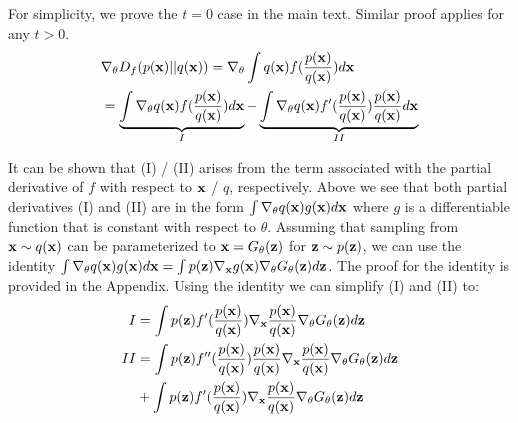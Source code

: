\begin{proofs} For simplicity, we prove the $t=0$ case in the main text. Similar proof applies for any $t>0$.
{\small
\begin{align*}
&\nabla_\theta D_f(p({\mathbf{x}})||q({\mathbf{x}})) =   \nabla_\theta \int q({\mathbf{x}}) f(\frac{p({\mathbf{x}})}{q({\mathbf{x}})}) d{\mathbf{x}} \\
    &=  \underbrace{\int \nabla_\theta q({\mathbf{x}}) f(\frac{p({\mathbf{x}})}{q({\mathbf{x}})}) d{\mathbf{x}}}_{I} - \underbrace{\int \nabla_\theta q({\mathbf{x}}) f'(\frac{p({\mathbf{x}})}{q({\mathbf{x}})}) \frac{p({\mathbf{x}})}{q({\mathbf{x}})}  d{\mathbf{x}}}_{II}
\end{align*}
}%
    \iffalse
\begin{align*}
&\nabla_\theta D_f(p(\rvx)||q(\rvx)) =   \nabla_\theta \int q(\rvx) f(\frac{p(\rvx)}{q(\rvx)}) d\rvx \\
    &\overset{\rvx=G_\theta(\rvz)}{=}  \nabla_\theta \int p_{\textrm{prior}}(\rvz) f(\frac{p(G_\theta(\rvz))}{q(G_\theta(\rvz))}) d\rvz \\
    &=  \int p_{\textrm{prior}}(\rvz) f'\left(\frac{p(\rvx)}{q(\rvx)}\right)\nabla_{\rvx} \frac{p(\rvx)}{q_{\textrm{sg}}(\rvx)}\nabla_\theta G_\theta(\rvz) d\rvz  \\
    &\qquad -   \int p_{\textrm{prior}}(\rvz) f'\left(\frac{p(\rvx)}{q(\rvx)}\right)\frac{p(\rvx)}{q^2(\rvx)}\nabla_\theta q(G_{\theta_{\textrm{sg}}}(\rvz)) d\rvz
    \numberthis \label{eq:full-grad}
    \end{align*}
\fi
It can be shown that (I) / (II) arises from the term associated with the partial derivative of $f$ with respect to ${\mathbf{x}}$ / $q$, respectively. Above we see that both partial derivatives (I) and (II) are in the form $\int \nabla_\theta q({\mathbf{x}}) g({\mathbf{x}}) d{\mathbf{x}}$ where $g$ is a differentiable function that is constant with respect to $\theta$. Assuming that sampling from ${\mathbf{x}} \sim q({\mathbf{x}})$ can be parameterized to ${\mathbf{x}} = G_\theta({\mathbf{z}})$ for ${\mathbf{z}} \sim p({\mathbf{z}})$, we can use the identity $\int \nabla_\theta q({\mathbf{x}}) g({\mathbf{x}}) d{\mathbf{x}} = \int p({\mathbf{z}}) \nabla_{\mathbf{x}} g({\mathbf{x}}) \nabla_\theta G_\theta({\mathbf{z}}) d{\mathbf{z}}$. The proof for the identity is provided in the Appendix. Using the identity we can simplify (I) and (II) to:
{
\begin{align*}
I &= \int p(\rvz) f'(\frac{p(\rvx)}{q(\rvx)}) \nabla_\rvx \frac{p(\rvx)}{q(\rvx)} \nabla_\theta G_\theta(\rvz) d\rvz \\
II &= \int p(\rvz) f''(\frac{p(\rvx)}{q(\rvx)}) \frac{p(\rvx)}{q(\rvx)} \nabla_\rvx \frac{p(\rvx)}{q(\rvx)} \nabla_\theta G_\theta(\rvz) d\rvz \\
& + \int p(\rvz) f'(\frac{p(\rvx)}{q(\rvx)}) \nabla_\rvx \frac{p(\rvx)}{q(\rvx)} \nabla_\theta G_\theta(\rvz) d\rvz 

\end{align*}}
\end{proofs}

